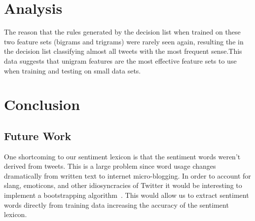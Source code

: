 \documentclass[11pt]{article}
\begin{document}
\section{Analysis}
The reason that the rules generated by the decision list when trained on these two feature sets (bigrams and trigrams) were rarely seen again, resulting the in the decision list classifying almost all tweets with the most frequent sense.This data suggests that unigram features are the most effective feature sets to use when training and testing on small data sets. 


\section{Conclusion}
\subsection{Future Work}
One shortcoming to our sentiment lexicon is that the sentiment words weren't derived from tweets. This is a large problem since word usage changes dramatically from written text to internet micro-blogging. In order to account for slang, emoticons, and other idiosyncracies of Twitter it would be interesting to implement a bootstrapping algorithm~\cite{Riloffbootstrapping}. This would allow us to extract sentiment words directly from training data increasing the accuracy of the sentiment lexicon.



\end{document}
